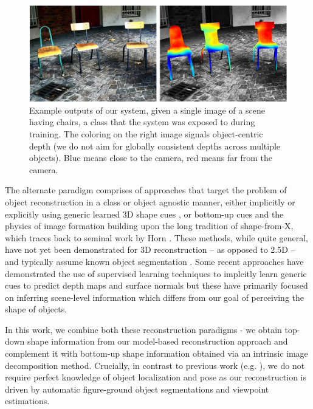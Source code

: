 \begin{figure}[t]
\includegraphics[width = \textwidth]{figures/categoryshapes/teaserChair.pdf}
\caption{Example outputs of our system, given a single image of a scene having chairs, a class that the system was exposed to during training. The coloring on the right image signals object-centric depth (we do not aim for globally consistent depths across multiple objects). Blue means close to the camera, red means far from the camera.}
\end{figure}

The alternate paradigm comprises of approaches that target the problem of object reconstruction in a class or object agnostic manner, either implicitly or explicitly using generic learned 3D shape cues \cite{hoiem2005automatic, saxena2009make3d}, or bottom-up cues and the physics of image formation \cite{Karsch2013,barronPAMI13} building upon the long tradition of shape-from-X, which traces back to seminal work by Horn \cite{HORNThesis1970}. These methods, while quite general, have not yet been demonstrated for 3D reconstruction -- as opposed to 2.5D -- and typically assume known object segmentation \cite{barronPAMI13}. Some recent approaches have demonstrated the use of supervised learning techniques to implcitly learn generic cues to predict depth maps \cite{eigennips14} and surface normals \cite{eigen2015predicting, wang2015designing} but these have primarily focused on  inferring scene-level information which differs from our goal of perceiving the shape of objects.

In this work, we combine both these reconstruction paradigms - we obtain top-down shape information from our model-based reconstruction approach and complement it with bottom-up shape information obtained via an intrinsic image decomposition method.  Crucially, in contrast to previous work (e.g. \cite{barronPAMI13,carvi14,cashman2013dolphins}), we do not require perfect knowledge of object localization and pose as our reconstruction is driven by automatic figure-ground object segmentations and viewpoint estimations.


